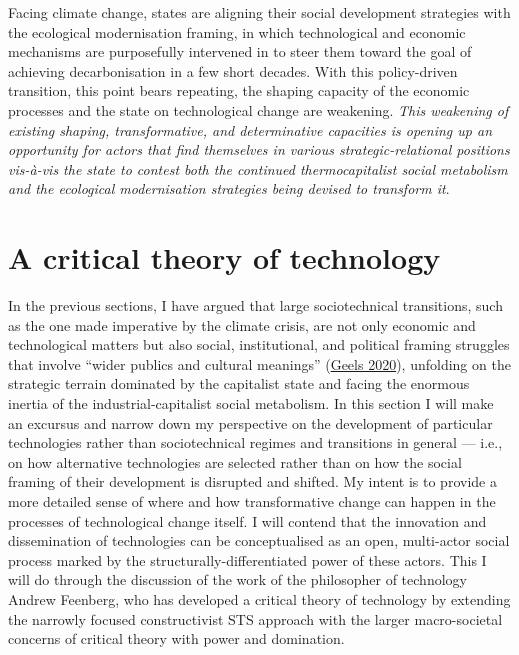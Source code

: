 \documentclass[a4paper, nobind]{templates/ociamthesis}
\begin{document}
Facing climate change, states are aligning their social development strategies with the ecological modernisation framing, in which technological and economic mechanisms are purposefully intervened in to steer them toward the goal of achieving decarbonisation in a few short decades. With this policy-driven transition, this point bears repeating, the shaping capacity of the economic processes and the state on technological change are weakening. \emph{This weakening of existing shaping, transformative, and determinative capacities is opening up an opportunity for actors that find themselves in various strategic-relational positions vis-à-vis the state to contest both the continued thermocapitalist social metabolism and the ecological modernisation strategies being devised to transform it}.

\hypertarget{a-critical-theory-of-technology}{%
\section{A critical theory of technology}\label{a-critical-theory-of-technology}}

In the previous sections, I have argued that large sociotechnical transitions, such as the one made imperative by the climate crisis, are not only economic and technological matters but also social, institutional, and political framing struggles that involve ``wider publics and cultural meanings'' (\protect\hyperlink{ref-geels_micro-foundations_2020}{Geels 2020}), unfolding on the strategic terrain dominated by the capitalist state and facing the enormous inertia of the industrial-capitalist social metabolism. In this section I will make an excursus and narrow down my perspective on the development of particular technologies rather than sociotechnical regimes and transitions in general ­--- i.e., on how alternative technologies are selected rather than on how the social framing of their development is disrupted and shifted. My intent is to provide a more detailed sense of where and how transformative change can happen in the processes of technological change itself. I will contend that the innovation and dissemination of technologies can be conceptualised as an open, multi-actor social process marked by the structurally-differentiated power of these actors. This I will do through the discussion of the work of the philosopher of technology Andrew Feenberg, who has developed a critical theory of technology by extending the narrowly focused constructivist STS approach with the larger macro-societal concerns of critical theory with power and domination.
\end{document}
